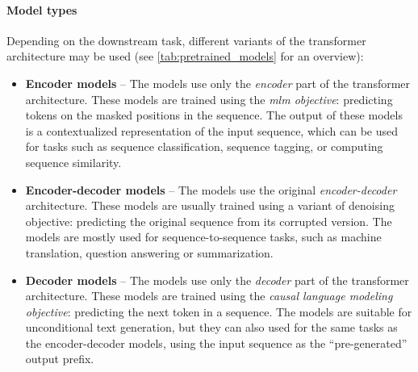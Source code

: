 \paragraph{Model types} Depending on the downstream task, different variants of the transformer architecture may be used (see \autoref{tab:pretrained_models} for an overview):

\begin{itemize}
    \item \textbf{Encoder models} -- The models use only the \emph{encoder} part of the transformer architecture. These models are trained using the \emph{\ac{mlm} objective}: predicting tokens on the masked positions in the sequence. The output of these models is a contextualized representation of the input sequence, which can be used for tasks such as sequence classification, sequence tagging, or computing sequence similarity.
    \item \textbf{Encoder-decoder models} -- The models use the original \emph{encoder-decoder} architecture. These models are usually trained using a variant of denoising objective: predicting the original sequence from its corrupted version. The models are mostly used for sequence-to-sequence tasks, such as machine translation, question answering or summarization.
    \item \textbf{Decoder models} -- The models use only the \emph{decoder} part of the transformer architecture. These models are trained using the \emph{causal language modeling objective}: predicting the next token in a sequence. The models are suitable for unconditional text generation, but they can also used for the same tasks as the encoder-decoder models, using the input sequence as the ``pre-generated'' output prefix.
\end{itemize}

